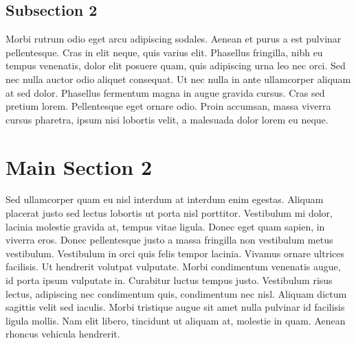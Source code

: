 
\subsection{Subsection 2}
Morbi rutrum odio eget arcu adipiscing sodales. Aenean et purus a est pulvinar pellentesque. Cras in elit neque, quis varius elit. Phasellus fringilla, nibh eu tempus venenatis, dolor elit posuere quam, quis adipiscing urna leo nec orci. Sed nec nulla auctor odio aliquet consequat. Ut nec nulla in ante ullamcorper aliquam at sed dolor. Phasellus fermentum magna in augue gravida cursus. Cras sed pretium lorem. Pellentesque eget ornare odio. Proin accumsan, massa viverra cursus pharetra, ipsum nisi lobortis velit, a malesuada dolor lorem eu neque.


\section{Main Section 2}

Sed ullamcorper quam eu nisl interdum at interdum enim egestas. Aliquam placerat justo sed lectus lobortis ut porta nisl porttitor. Vestibulum mi dolor, lacinia molestie gravida at, tempus vitae ligula. Donec eget quam sapien, in viverra eros. Donec pellentesque justo a massa fringilla non vestibulum metus vestibulum. Vestibulum in orci quis felis tempor lacinia. Vivamus ornare ultrices facilisis. Ut hendrerit volutpat vulputate. Morbi condimentum venenatis augue, id porta ipsum vulputate in. Curabitur luctus tempus justo. Vestibulum risus lectus, adipiscing nec condimentum quis, condimentum nec nisl. Aliquam dictum sagittis velit sed iaculis. Morbi tristique augue sit amet nulla pulvinar id facilisis ligula mollis. Nam elit libero, tincidunt ut aliquam at, molestie in quam. Aenean rhoncus vehicula hendrerit.